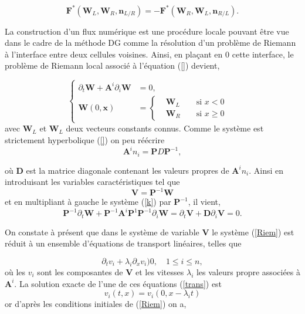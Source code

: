 \documentclass[a4paper,oneside,10pt]{report}
\begin{document}
\begin{equation}
\mathbf{F}^*(\mathbf{W}_L,\mathbf{W}_R,\mathbf{n}_{L/R}) = -\mathbf{F}^*(\mathbf{W}_R,\mathbf{W}_L,\mathbf{n}_{R/L}).
\end{equation}

La construction d'un flux numérique est une procédure locale pouvant être vue dans le cadre de la méthode DG comme la résolution d'un problème de Riemann à l'interface entre deux cellules voisines. Ainsi, en plaçant en $0$ cette interface, le problème de Riemann local associé à l'équation (\ref{}) devient,

\begin{equation}
\label{Riem}
\left\{
\begin{aligned}
\partial_t \mathbf{W} + \mathbf{A}^i \partial_i \mathbf{W} &= 0,\\
\mathbf{W}(0,\mathbf{x}) &= \left\{
\begin{aligned}
&\mathbf{W}_L& &\mbox{ si } x < 0&\\
&\mathbf{W}_R& &\mbox{ si } x \geq 0&
\end{aligned}
\right.
\end{aligned}
\right.
\end{equation}
avec $\mathbf{W}_L$ et $\mathbf{W}_L$ deux vecteurs constants connus. Comme le système est strictement hyperbolique (\ref{}) on peu réécrire 
\begin{equation}
\mathbf{A}^i n_i=\mathbf{P}D\mathbf{P}^{-1},
\end{equation}

où $\mathbf{D}$ est la matrice diagonale contenant les valeurs propres de $\mathbf{A}^i n_i$. Ainsi en introduisant les variables caractéristiques tel que 
\begin{equation}
\mathbf{V} = \mathbf{P}^{-1}\mathbf{W}
\end{equation}
et en multipliant à gauche le système (\ref{k}) par $\mathbf{P}^{-1}$, il vient,
\begin{equation}
\mathbf{P}^{-1} \partial_t \mathbf{W} + \mathbf{P}^{-1} \mathbf{A}^i \mathbf{P}^{1}\mathbf{P}^{-1}   \partial_i \mathbf{W} = \partial_t \mathbf{V} + \mathbf{D} \partial_i \mathbf{V}  = 0.
\end{equation}

On constate à présent que dans le système de variable $\mathbf{V}$ le système (\ref{Riem}) est réduit à un ensemble d'équations de transport linéaires, telles que 

\begin{equation}
\label{trans}
\partial_t v_i + \lambda_i \partial_x v_i ) 0, \quad 1\leq i \leq n,
\end{equation}
où les $v_i$ sont les composantes de $\mathbf{V}$ et les vitesses $\lambda_i$ les valeurs propre associées à  $\mathbf{A}^i$.
La solution exacte de l'une de ces équations (\ref{trans}) est 
\begin{equation}
v_i(t,x) = v_i(0, x-\lambda_it)
\end{equation} 
or d'après les conditions initiales de (\ref{Riem}) on a, 
\end{document}
